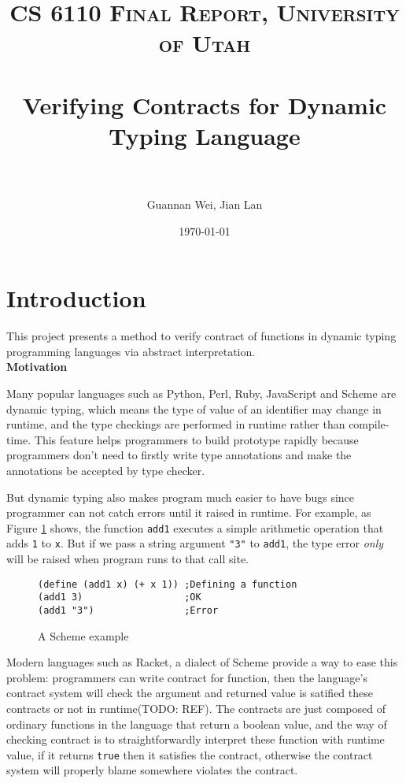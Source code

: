 \documentclass[paper=a4, fontsize=11pt]{scrartcl} %
\title{	
\normalfont \normalsize 
\textsc{CS 6110 Final Report, University of Utah} \\ [25pt] %
\horrule{0.5pt} \\[0.4cm] %
\huge Verifying Contracts for Dynamic Typing Language \\ %
\horrule{2pt} \\[0.5cm] %
}
\author{Guannan Wei, Jian Lan} %
\date{\normalsize\today} %
\numberwithin{equation}{section} %
\numberwithin{figure}{section} %
\numberwithin{table}{section} %
\begin{document}
\maketitle %

\section{Introduction}

This project presents a method to verify contract of functions in dynamic typing programming languages via abstract interpretation. \\

\textbf{Motivation}

Many popular languages such as Python, Perl, Ruby, JavaScript and Scheme are dynamic typing, which means the type of value of an identifier may change in runtime, and the type checkings are performed in runtime rather than compile-time. This feature helps programmers to build prototype rapidly because programmers don't need to firstly write type annotations and make the annotations be accepted by type checker.

But dynamic typing also makes program much easier to have bugs since programmer can not catch errors until it raised in runtime. For example, as Figure \ref{fig1} shows, the function \texttt{add1} executes a simple arithmetic operation that adds \texttt{1} to \texttt{x}. But if we pass a string argument \texttt{"3"} to \texttt{add1}, the type error \textit{only} will be raised when program runs to that call site.

\begin{figure}[h!]
\lstset{language=Lisp}
\begin{lstlisting}[frame=single]
(define (add1 x) (+ x 1)) ;Defining a function
(add1 3)                  ;OK
(add1 "3")                ;Error
\end{lstlisting} 
\caption{A Scheme example}
\label{fig1}
\end{figure}

Modern languages such as Racket, a dialect of Scheme provide a way to ease this problem: programmers can write contract for function, then the language's contract system will check the argument and returned value is satified these contracts or not in runtime(TODO: REF). The contracts are just composed of ordinary functions in the language that return a boolean value, and the way of checking contract is to straightforwardly interpret these function with runtime value, if it returns \texttt{true} then it satisfies the contract, otherwise the contract system will properly blame somewhere violates the contract.
\end{document}
